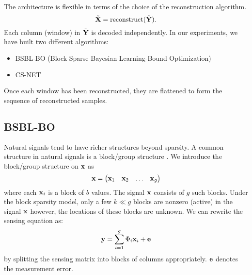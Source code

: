 The architecture is flexible in terms of the choice of the
reconstruction algorithm.
\begin{equation}
\tilde{\mathbf{X}} = \mathrm{reconstruct}(\tilde{\mathbf{Y}}).
\end{equation}
Each column (window) in $\tilde{\mathbf{Y}}$ is decoded independently.
In our experiments, we have built two different algorithms:
\begin{itemize}
  \item BSBL-BO (Block Sparse Bayesian Learning-Bound Optimization)
  \cite{zhang2013extension,zhang2012compressed,zhang2016comparison}
  \item CS-NET \cite{zhang2021csnet}
\end{itemize}
Once each window has been reconstructed, they are flattened
to form the sequence of reconstructed samples.

\subsection{BSBL-BO}
Natural signals tend to have richer structures beyond
sparsity.
A common structure in natural signals
is a block/group structure \cite{eldar2010block}. 
We introduce the block/group structure on $\mathbf{x}$ as
\begin{equation}
\mathbf{x} = \begin{pmatrix}
\mathbf{x}_1 & \mathbf{x}_2 & \dots & \mathbf{x}_g
\end{pmatrix}
\end{equation}
where each $\mathbf{x}_i$ is a block of $b$ values.
The signal $\mathbf{x}$ consists of $g$ such blocks.
Under the block sparsity model, only a few $k \ll g$
blocks are nonzero (active) in the signal $\mathbf{x}$
however, the locations of these blocks are unknown.
We can rewrite the sensing equation as:
\begin{equation}
\mathbf{y} = \sum_{i=1}^g \Phi_i \mathbf{x}_i + \mathbf{e}
\end{equation}
by splitting the sensing matrix into blocks of columns appropriately.
$\mathbf{e}$ denotes the measurement error.

